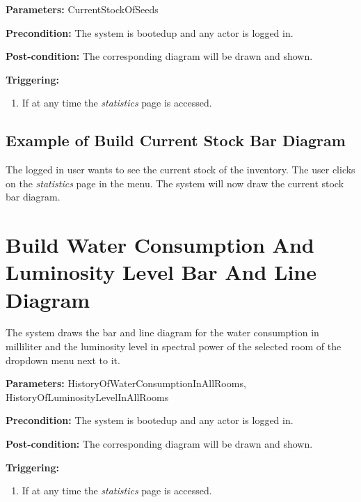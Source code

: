 \begin{description}

\item \textbf{Parameters:} CurrentStockOfSeeds
\item \textbf{Precondition:} The system is bootedup and any actor is logged in.
\item \textbf{Post-condition:} The corresponding diagram will be drawn and
shown.

\item \textbf{Triggering:}
\begin{enumerate}
\item If at any time the \emph{statistics} page is accessed.
\end{enumerate}
\end{description}

\subsection{Example of Build Current Stock Bar Diagram}
The logged in user wants to see the current stock of the inventory.
The user clicks on the \emph{statistics} page in the menu.
The system will now draw the current stock bar diagram.



\break
\section{Build Water Consumption And Luminosity Level Bar And Line Diagram}
\label{operation:BuildWaterConsumptionAndLuminosityLevelDiagram}
The system draws the bar and line diagram for the water consumption in
milliliter and the luminosity level in spectral power of the selected room of
the dropdown menu next to it.

\begin{description}

\item \textbf{Parameters:} HistoryOfWaterConsumptionInAllRooms,
HistoryOfLuminosityLevelInAllRooms
\item \textbf{Precondition:} The system is bootedup and any actor is logged in.
\item \textbf{Post-condition:} The corresponding diagram will be drawn and
shown.

\item \textbf{Triggering:}
\begin{enumerate}
\item If at any time the \emph{statistics} page is accessed.
\end{enumerate}
\end{description}

